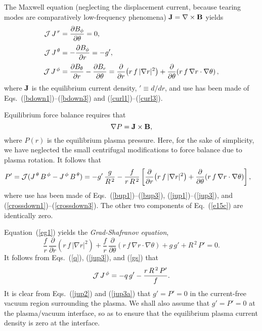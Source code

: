 \documentclass[12pt,prb,aps]{revtex4-1}
\begin{document}
The Maxwell equation (neglecting the displacement current, because tearing modes are comparatively low-frequency phenomena)
${\bf J}= \nabla\times{\bf B}$
yields
\begin{align}
{\cal J}\,J^{\,r} &= \frac{\partial B_\phi}{\partial \theta} =0,\label{jup1}\\[0.5ex]
{\cal J}\,J^{\,\theta} &= -\frac{\partial B_\phi}{\partial r} = - g',\label{jup2}\\[0.5ex]
{\cal J}\,J^{\,\phi}&= \frac{\partial B_\theta}{\partial r} -\frac{\partial B_r}{\partial\theta}=\frac{\partial}{\partial r}\!\left(r\,f\,|\nabla r|^2\right)+ \frac{\partial}{\partial\theta}\!\left(r\,f\,\nabla r\cdot\nabla\theta\right),\label{jup3}
\end{align}
where ${\bf J}$ is the equilibrium current density, $'\equiv d/dr$, and use has been made of  Eqs.~(\ref{bdown1})--(\ref{bdown3}) and (\ref{curl1})--(\ref{curl3}).

Equilibrium force balance requires that
\begin{equation}\label{e15c}
 \nabla P={\bf J}\times {\bf B},
\end{equation}
where $P(r)$ is the equilibrium plasma pressure. Here, for the sake of simplicity, we have neglected the small centrifugal modifications to force balance due to plasma
rotation.\cite{flow,flow1}
It follows that 
\begin{align}\label{eg1}
P'&= {\cal J}(J^{\,\theta}\,B^{\,\phi}-J^{\,\phi}\,B^{\,\theta})= -g'\,\frac{g}{R^{\,2}} - \frac{f}{r\,R^{\,2}}\left[\frac{\partial}{\partial r}\!\left(r\,f\,|\nabla r|^2\right)+ \frac{\partial}{\partial\theta}\!\left(r\,f\,\nabla r\cdot\nabla\theta\right)\right],
\end{align}
where use has been made of Eqs.~(\ref{bup1})--(\ref{bup3}),  (\ref{jup1})--(\ref{jup3}), and (\ref{crossdown1})--(\ref{crossdown3}). The
other two components of Eq.~(\ref{e15c}) are identically zero. 

Equation~(\ref{eg1}) yields the {\em Grad-Shafranov equation},\cite{gs1}
\begin{equation}\label{gs}
\frac{f}{r}\,\frac{\partial}{\partial r}\!\left(r\,f\,|\nabla r|^2\right) +\frac{f}{r}\,\frac{\partial}{\partial\theta}\!\left(r\,f\,\nabla r\cdot\nabla\theta\right)+g\,g' + R^{\,2}\,P'=0.
\end{equation}
It follows from Eqs.~(\ref{q}), (\ref{jup3}), and (\ref{gs}) that
\begin{equation}\label{jup3a}
{\cal J}\,J^{\,\phi} = -q\,g' - \frac{r\,R^{\,2}\,P'}{f}.
\end{equation}
It is clear from Eqs.~(\ref{jup2}) and (\ref{jup3a}) that $g'=P'=0$ in the  current-free vacuum region surrounding the plasma.
We shall also assume that $g'=P'=0$ at the plasma/vacuum interface, so as to ensure that the equilibrium plasma
current density is zero at the interface. 
\end{document}
